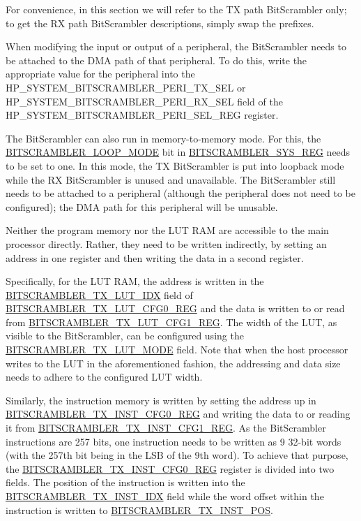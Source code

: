 \documentclass[main\_\_EN.tex]{subfiles}
\begin{document}
\begin{tiplisting}
For convenience, in this section we will refer to the TX path BitScrambler only; to get the RX path BitScrambler descriptions, simply swap the prefixes.
\end{tiplisting}

When modifying the input or output of a peripheral, the BitScrambler needs to be attached to the DMA path of that peripheral. To do this, write the appropriate value for the peripheral into the HP\_SYSTEM\_BITSCRAMBLER\_PERI\_TX\_SEL or HP\_SYSTEM\_BITSCRAMBLER\_PERI\_RX\_SEL field of the HP\_SYSTEM\_BITSCRAMBLER\_PERI\_SEL\_REG register.

The  BitScrambler can also run in memory-to-memory mode. For this, the \hyperref[fielddesc:BITSCRAMBLERLOOPMODE]{BITSCRAMBLER\_LOOP\_MODE} bit in \hyperref[regdesc:BITSCRAMBLERSYSREG]{BITSCRAMBLER\_SYS\_REG} needs to be set to one. In this mode, the TX BitScrambler is put into loopback mode while the RX BitScrambler is unused and unavailable. The BitScrambler still needs to be attached to a peripheral (although the peripheral does not need to be configured); the DMA path for this peripheral will be unusable.

Neither the program memory nor the LUT RAM are accessible to the main processor directly. Rather, they need to be written indirectly, by setting an address in one register and then writing the data in a second register.

Specifically, for the LUT RAM, the address is written in the \hyperref[fielddesc:BITSCRAMBLERTXLUTIDX]{BITSCRAMBLER\_TX\_LUT\_IDX} field of \hyperref[regdesc:BITSCRAMBLERTXLUTCFG0REG]{BITSCRAMBLER\_TX\_LUT\_CFG0\_REG} and the data is written to or read from \hyperref[regdesc:BITSCRAMBLERTXLUTCFG1REG]{BITSCRAMBLER\_TX\_LUT\_CFG1\_REG}. The width of the LUT, as visible to the BitScrambler, can be configured using the \hyperref[fielddesc:BITSCRAMBLERTXLUTMODE]{BITSCRAMBLER\_TX\_LUT\_MODE} field. Note that when the host processor writes to the LUT in the aforementioned fashion, the addressing and data size needs to adhere to the configured LUT width.

Similarly, the instruction memory is written by setting the address up in \hyperref[regdesc:BITSCRAMBLERTXINSTCFG0REG]{BITSCRAMBLER\_TX\_INST\_CFG0\_REG} and writing the data to or reading it from \hyperref[regdesc:BITSCRAMBLERTXINSTCFG1REG]{BITSCRAMBLER\_TX\_INST\_CFG1\_REG}. As the BitScrambler instructions are 257 bits, one instruction needs to be written as 9 32-bit words (with the 257th bit being in the LSB of the 9th word). To achieve that purpose, the \hyperref[regdesc:BITSCRAMBLERTXINSTCFG0REG]{BITSCRAMBLER\_TX\_INST\_CFG0\_REG} register is divided into two fields. The position of the instruction is written into the \hyperref[fielddesc:BITSCRAMBLERTXINSTIDX]{BITSCRAMBLER\_TX\_INST\_IDX} field while the word offset within the instruction is written to \hyperref[fielddesc:BITSCRAMBLERTXINSTPOS]{BITSCRAMBLER\_TX\_INST\_POS}.
\end{document}
